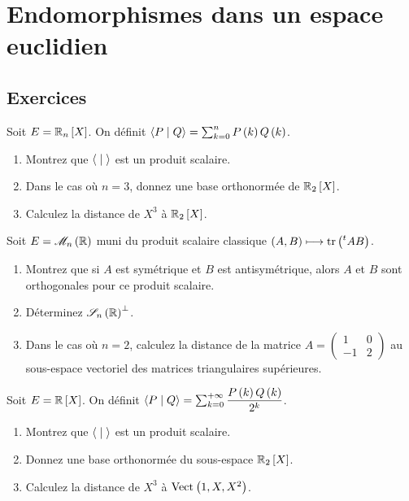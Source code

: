 \chapter{Endomorphismes dans un espace euclidien}\label{exos_ee}

\minitoc

\section*{Exercices}

\legendeexercices

\begin{exos}
Soit \(E=\polydeg[\R]{n}\). On définit \(\left\langle P\;\middle|\; Q\right\rangle=\sum_{k=0}^nP\left(k\right)Q\left(k\right)\).

\begin{enumerate}
    \item Montrez que \(\left\langle\;\middle|\;\right\rangle\) est un produit scalaire. \\
    \item Dans le cas où \(n=3\), donnez une base orthonormée de \(\polydeg[\R]{2}\). \\
    \item Calculez la distance de \(X^3\) à \(\polydeg[\R]{2}\).
\end{enumerate}
\end{exos}

\begin{exos}
Soit \(E=\M{n}[\R]\) muni du produit scalaire classique \(\left(A,B\right)\longmapsto\operatorname{tr}\left(\prescript{t}{}{A}B\right)\).

\begin{enumerate}
    \item Montrez que si \(A\) est symétrique et \(B\) est antisymétrique, alors \(A\) et \(B\) sont orthogonales pour ce produit scalaire. \\
    \item Déterminez \(\sym{n}[\R]\ortho\). \\
    \item Dans le cas où \(n=2\), calculez la distance de la matrice \(A=\begin{pmatrix}
        1 & 0 \\
        -1 & 2
    \end{pmatrix}\) au sous-espace vectoriel des matrices triangulaires supérieures.
\end{enumerate}
\end{exos}

\begin{exoss}
Soit \(E=\poly[\R]\). On définit \(\left\langle P\;\middle|\; Q\right\rangle=\sum_{k=0}^{+\infty}\dfrac{P\left(k\right)Q\left(k\right)}{2^k}\).

\begin{enumerate}
    \item Montrez que \(\left\langle\;\middle|\;\right\rangle\) est un produit scalaire. \\
    \item Donnez une base orthonormée du sous-espace \(\polydeg[\R]{2}\). \\
    \item Calculez la distance de \(X^3\) à \(\Vect{1,X,X^2}\).
\end{enumerate}
\end{exoss}

